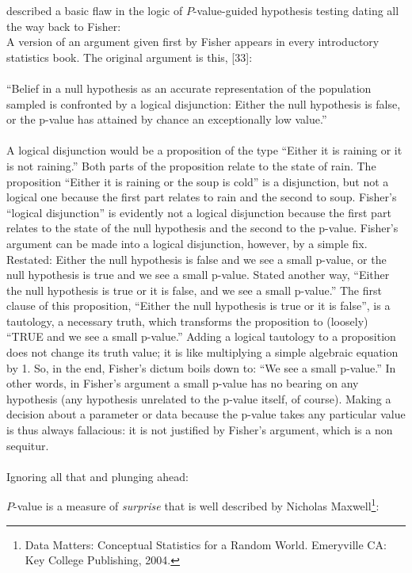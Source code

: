    described a basic flaw in the logic of $P$-value-guided hypothesis
   testing dating all the way back to Fisher:\\
   {\smaller
A version of an argument given first by Fisher appears in every
introductory statistics book. The original argument is this,
[33]:\\~\\``Belief in a null hypothesis as an accurate representation of
the population sampled is confronted by a logical disjunction: Either
the null hypothesis is false, or the p-value has attained by chance an
exceptionally low value.''\\~\\
A logical disjunction would be a proposition of the type ``Either it
is raining or it is not raining.'' Both parts of the proposition
relate to the state of rain. The proposition ``Either it is raining or
the soup is cold'' is a disjunction, but not a logical one because the
first part relates to rain and the second to soup. Fisher's ``logical
disjunction'' is evidently not a logical disjunction because the first
part relates to the state of the null hypothesis and the second to the
p-value.  Fisher's argument can be made into a logical disjunction,
however, by a simple fix. Restated: Either the null hypothesis is
false and we see a small p-value, or the null hypothesis is true and
we see a small p-value. Stated another way, ``Either the null
hypothesis is true or it is false, and we see a small p-value.'' The
first clause of this proposition, ``Either the null hypothesis is true
or it is false'', is a tautology, a necessary truth, which transforms
the proposition to (loosely) ``TRUE and we see a small p-value.''
Adding a logical tautology to a proposition does not change its truth
value; it is like multiplying a simple algebraic equation by 1.  So,
in the end, Fisher's dictum boils down to: ``We see a small p-value.''
In other words, in Fisher's argument a small p-value has no bearing on
any hypothesis (any hypothesis unrelated to the p-value itself, of
course). Making a decision about a parameter or data because the
p-value takes any particular value is thus always fallacious: it is not
justified by Fisher's argument, which is a non sequitur.       
     } \\~\\
   Ignoring all that and plunging ahead:
 \item $P$-value is a measure of \emph{surprise} that is well described
   by Nicholas Maxwell\footnote{Data Matters: Conceptual Statistics
     for a Random World.  Emeryville CA: Key College Publishing, 2004.}:
